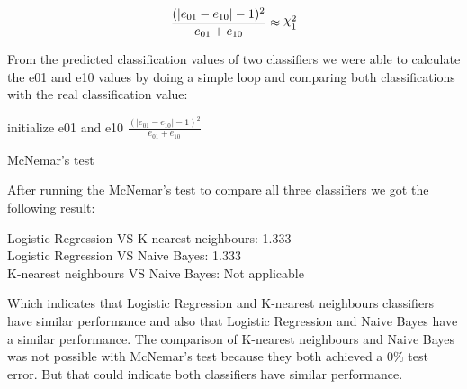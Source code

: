 \documentclass[a4paper]{article}
\DeclareRobustCommand{\rchi}{{\mathpalette\irchi\relax}}
\newcommand{\irchi}[2]{\raisebox{\depth}{$#1\chi$}}
\begin{document}
\begin{equation}
\frac{(|e_{01} - e_{10}| - 1)^2}{e_{01}+e_{10}}\approx\rchi^2_{1}
\end{equation}

From the predicted classification values of two classifiers we were able to calculate the e01 and e10 values by 
doing a simple loop and comparing both classifications with the real classification value:\\

\begin{algorithm}[H]
	initialize e01 and e10\;
	\Return $\frac{(|e_{01} - e_{10}| - 1)^2}{e_{01}+e_{10}}$
	\caption{McNemar's test}
\end{algorithm}
\bigbreak

After running the McNemar's test to compare all three classifiers we got the following result:\\
\begin{center}
Logistic Regression VS K-nearest neighbours: 1.333\\
Logistic Regression VS Naive Bayes: 1.333\\
K-nearest neighbours VS Naive Bayes: Not applicable
\end{center}

Which indicates that Logistic Regression and K-nearest neighbours classifiers have similar performance and
also that Logistic Regression and Naive Bayes have a similar performance.
The comparison of K-nearest neighbours and Naive Bayes was not possible with McNemar's test because
they both achieved a 0\% test error. But that could indicate both classifiers have similar performance.
\end{document}
